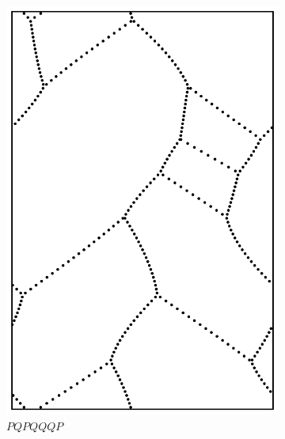 \documentclass[12pt,twoside]{reedthesis}
\theoremstyle{definition}
\begin{document}
\begin{figure}[h]
\begin{subfigure}[t]{0.24\textwidth}
    \includegraphics[width=\textwidth]{figures/string_cheese_appendix/pqpqqqp.pdf}
    \caption*{$PQPQQQP$}
    \vspace{5mm}
  \end{subfigure}
  \hfill
  \begin{subfigure}[t]{0.24\textwidth}

\end{subfigure}
\end{figure}
\end{document}
